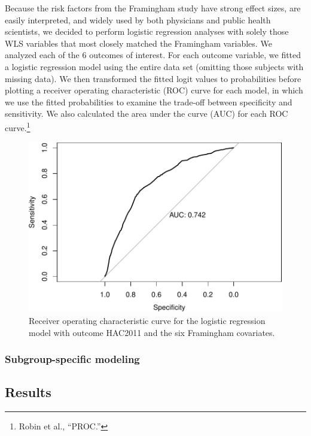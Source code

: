 \documentclass[11pt,]{article}
\let\rmarkdownfootnote\footnote%
\def\footnote{\protect\rmarkdownfootnote}
\begin{document}
Because the risk factors from the Framingham study have strong effect
sizes, are easily interpreted, and widely used by both physicians and
public health scientists, we decided to perform logistic regression
analyses with solely those WLS variables that most closely matched the
Framingham variables. We analyzed each of the 6 outcomes of interest.
For each outcome variable, we fitted a logistic regression model using
the entire data set (omitting those subjects with missing data). We then
transformed the fitted logit values to probabilities before plotting a
receiver operating characteristic (ROC) curve for each model, in which
we use the fitted probabilities to examine the trade-off between
specificity and sensitivity. We also calculated the area under the curve
(AUC) for each ROC curve.\footnote{Robin et al., ``PROC.'' }

\begin{figure}[htbp]
\centering
\includegraphics{report2_files/figure-latex/plot-hac2011-1.pdf}
\caption{Receiver operating characteristic curve for the logistic
regression model with outcome HAC2011 and the six Framingham
covariates.}
\end{figure}

\subsubsection{Subgroup-specific
modeling}\label{subgroup-specific-modeling}

\subsection{Results}\label{results}
\end{document}
